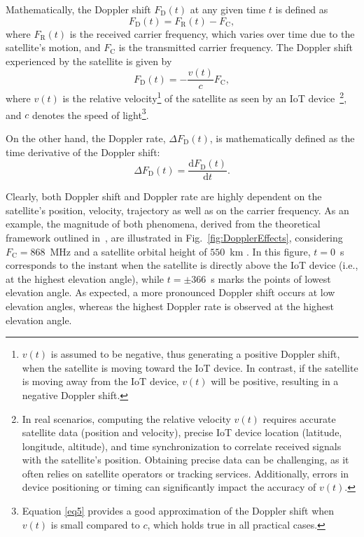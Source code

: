 \documentclass{IEEEtran}
\begin{document}
Mathematically, the Doppler shift $F_{\mathrm{D}}(t)$ at any given time $t$ is defined as~\cite{Ullah.2024}
\begin{equation}
F_\mathrm{D}(t) = F_\mathrm{R}(t) - F_\mathrm{C},
\end{equation}
where $F_{\mathrm{R}}(t)$ is the received carrier frequency, which varies over time due to the satellite's motion, and $F_{\mathrm{C}}$ is the transmitted carrier frequency. The Doppler shift experienced by the satellite is given by
\begin{equation}
	F_\mathrm{D}(t) = -\frac{v(t)}{c}F_\mathrm{C},
    \label{eq5}
\end{equation}
where $v(t)$ is the relative velocity\footnote{$v(t)$ is assumed to be negative, thus generating a positive Doppler shift, when the satellite is moving toward the \ac{IoT} device. In contrast, if the satellite is moving away from the \ac{IoT} device, $v(t)$ will be positive, resulting in a negative Doppler shift.} of the satellite as seen by an \ac{IoT} device~\footnote{In real scenarios, computing the relative velocity $v(t)$ requires accurate satellite data (position and velocity), precise IoT device location (latitude, longitude, altitude), and time synchronization to correlate received signals with the satellite's position. Obtaining precise data can be challenging, as it often relies on satellite operators or tracking services. Additionally, errors in device positioning or timing can significantly impact the accuracy of $v(t)$.}, and $c$ denotes the speed of light\footnote{Equation \eqref{eq5} provides a good approximation of the Doppler shift when $v(t)$ is small compared to $c$, which holds true in all practical cases.}.

On the other hand, the Doppler rate,  $\Delta F_{\mathrm{D}}(t)$, is mathematically defined as the time derivative of the Doppler shift:
\begin{equation}
    \Delta F_{\mathrm{D}}(t) = \frac{\mathrm{d}F_{\mathrm{D}}(t)}{\mathrm{d}t}.
\end{equation}

Clearly, both  Doppler shift and Doppler rate are highly dependent on the satellite's position, velocity, trajectory as well as on the carrier frequency. As an example, the magnitude of both phenomena, derived from the theoretical framework outlined in~\cite{Doroshkin.2019}, are illustrated in Fig.~\ref{fig:DopplerEffects}, considering ${F_\mathrm{C}=868}$~MHz and a satellite orbital height of $550$~km \cite{Semtech.AppNote_Doppler}. In this figure, ${t = 0}$~s corresponds to the instant when the satellite is directly above the \ac{IoT} device (i.e., at the highest elevation angle), while ${t=\pm 366}$~s marks the points of lowest elevation angle. As expected, a more pronounced Doppler shift occurs at low elevation angles, whereas the highest Doppler rate is observed at the highest elevation angle.
\end{document}
